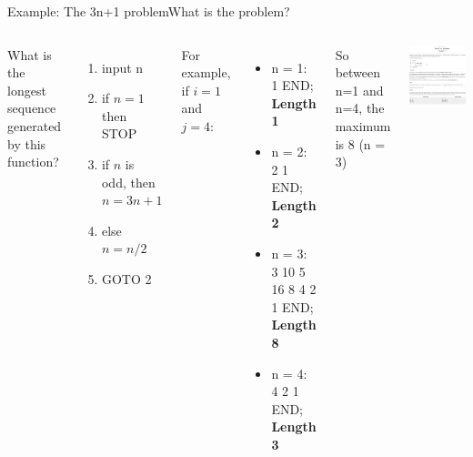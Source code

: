 \begin{frame}{Example: The 3n+1 problem}{What is the problem?}
  \begin{columns}
    {\smaller
    What is the longest sequence generated by this function?
      \begin{enumerate}
        \item input n
        \item if $n = 1$ then STOP
        \item if $n$ is odd, then $n = 3n + 1$
        \item else $n = n/2$
        \item GOTO 2
      \end{enumerate}

    For example, if $i = 1$ and $j = 4$:
    \begin{itemize}
      \item n = 1: 1 END; {\bf Length 1}
      \item n = 2: 2 1 END; {\bf Length 2}
      \item n = 3: 3 10 5 16 8 4 2 1 END; {\bf Length 8}
      \item n = 4: 4 2 1 END; {\bf Length 3}
    \end{itemize}
    So between n=1 and n=4, the maximum is 8 (n = 3)}
    \includegraphics[width=1\textwidth]{img/3n_problem_label}
  \end{columns}
\end{frame}

